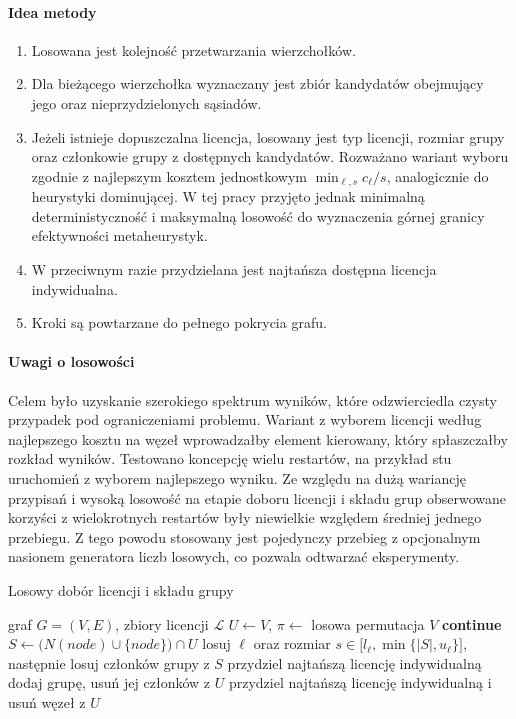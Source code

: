 \paragraph{Idea metody}
\begin{enumerate}
  \item Losowana jest kolejność przetwarzania wierzchołków.
  \item Dla bieżącego wierzchołka wyznaczany jest zbiór kandydatów obejmujący jego oraz nieprzydzielonych sąsiadów.
  \item Jeżeli istnieje dopuszczalna licencja, losowany jest typ licencji, rozmiar grupy oraz członkowie grupy z dostępnych kandydatów.
        Rozważano wariant wyboru zgodnie z najlepszym kosztem jednostkowym \(\min_{\ell,s} c_\ell/s\), analogicznie do heurystyki dominującej.
        W tej pracy przyjęto jednak minimalną deterministyczność i maksymalną losowość do wyznaczenia górnej granicy efektywności metaheurystyk.
  \item W przeciwnym razie przydzielana jest najtańsza dostępna licencja indywidualna.
  \item Kroki są powtarzane do pełnego pokrycia grafu.
\end{enumerate}

\paragraph{Uwagi o losowości}
Celem było uzyskanie szerokiego spektrum wyników, które odzwierciedla czysty przypadek pod ograniczeniami problemu.
Wariant z wyborem licencji według najlepszego kosztu na węzeł wprowadzałby element kierowany, który spłaszczałby rozkład wyników.
Testowano koncepcję wielu restartów, na przykład stu uruchomień z wyborem najlepszego wyniku.
Ze względu na dużą wariancję przypisań i wysoką losowość na etapie doboru licencji i składu grup obserwowane korzyści z wielokrotnych restartów były niewielkie względem średniej jednego przebiegu.
Z tego powodu stosowany jest pojedynczy przebieg z opcjonalnym nasionem generatora liczb losowych, co pozwala odtwarzać eksperymenty.

\begin{algorithm}[H]
  \caption{Losowy dobór licencji i składu grupy}\label{alg:randomized}
  \begin{algorithmic}[1]
    \Require graf $G=(V,E)$, zbiory licencji $\mathcal{L}$
    \State $U\gets V$, $\pi\gets$ losowa permutacja $V$
     \textbf{continue} \EndIf
    \State $S\gets \bigl(N(node)\cup\{node\}\bigr)\cap U$
    \State losuj $\ell$ oraz rozmiar $s\in\bigl[l_\ell,\min\{|S|,u_\ell\}\bigr]$, następnie losuj członków grupy z $S$
    \Else
    \State przydziel najtańszą licencję indywidualną
    \EndIf
    \State dodaj grupę, usuń jej członków z $U$
    \EndFor
     przydziel najtańszą licencję indywidualną i usuń węzeł z $U$ \EndWhile
  \end{algorithmic}
\end{algorithm}

